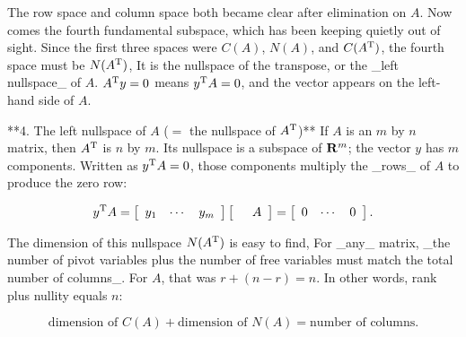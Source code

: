 The row space and column space both became clear after elimination on \(A\). Now comes the fourth fundamental subspace, which has been keeping quietly out of sight. Since the first three spaces were \(C(A)\), \(N(A)\), and \(C(A^{\rm T})\), the fourth space must be \(N(A^{\rm T})\), It is the nullspace of the transpose, or the _left nullspace_ of \(A\). \(A^{\rm T}y=0\) means \(y^{\rm T}A=0\), and the vector appears on the left-hand side of \(A\).

**4. The left nullspace of \(A\) (\(=\) the nullspace of \(A^{\rm T}\))** If \(A\) is an \(m\) by \(n\) matrix, then \(A^{\rm T}\) is \(n\) by \(m\). Its nullspace is a subspace of \({\bf R}^{m}\); the vector \(y\) has \(m\) components. Written as \(y^{\rm T}A=0\), those components multiply the _rows_ of \(A\) to produce the zero row:

\[y^{\rm T}A=\left[\begin{array}{ccc}y_{1}&\cdots&y_{m}\end{array}\right] \left[\begin{array}{cc}&A\end{array}\right]=\left[\begin{array}{ccc}0& \cdots&0\end{array}\right].\]

The dimension of this nullspace \(N(A^{\rm T})\) is easy to find, For _any_ matrix, _the number of pivot variables plus the number of free variables must match the total number of columns_. For \(A\), that was \(r+(n-r)=n\). In other words, rank plus nullity equals \(n\):

\[\mbox{dimension of }C(A)+\mbox{dimension of }N(A)=\mbox{number of columns}.\] 
